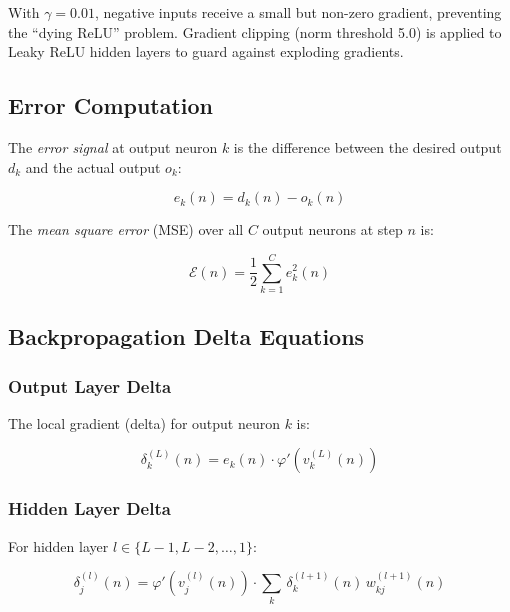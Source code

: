 \documentclass{acm_proc_article-sp}
\begin{document}
With $\gamma = 0.01$, negative inputs receive a small but non-zero
gradient, preventing the ``dying ReLU'' problem.  Gradient clipping
(norm threshold 5.0) is applied to Leaky ReLU hidden layers to guard
against exploding gradients.

\subsection{Error Computation}

The \textit{error signal} at output neuron $k$ is the difference between
the desired output $d_k$ and the actual output $o_k$:

\begin{equation}
  e_k(n) = d_k(n) - o_k(n)
\end{equation}

The \textit{mean square error} (MSE) over all $C$ output neurons at step
$n$ is:

\begin{equation}
  \mathcal{E}(n) = \frac{1}{2}\sum_{k=1}^{C} e_k^2(n)
  \label{eq:mse}
\end{equation}

\subsection{Backpropagation Delta Equations}

\subsubsection{Output Layer Delta}

The local gradient (delta) for output neuron $k$ is:

\begin{equation}
  \delta^{(L)}_k(n) = e_k(n) \cdot \varphi'\!\left(v^{(L)}_k(n)\right)
  \label{eq:delta_out}
\end{equation}

\subsubsection{Hidden Layer Delta}

For hidden layer $l \in \{L-1, L-2, \ldots, 1\}$:

\begin{equation}
  \delta^{(l)}_j(n) =
  \varphi'\!\left(v^{(l)}_j(n)\right)
  \cdot \sum_{k}\, \delta^{(l+1)}_k(n)\, w^{(l+1)}_{kj}(n)
  \label{eq:delta_hidden}
\end{equation}
\end{document}
